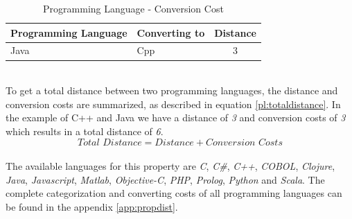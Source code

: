 \begin{table}[h]
	\centering 
	\setlength{\tabcolsep}{4pt}
	\begin{tabular}{|l|l|c|}\hline
		Programming Language	& Converting to &  Distance 	\\ \hline
		Java   				& Cpp		& 3      		\\ \hline
	\end{tabular} 
	\caption{Programming Language - Conversion Cost} 
	\label{property:proglangconversion} 
\end{table}\\
To get a total distance between two programming languages, the distance and conversion costs are summarized, as described in equation \ref{pl:totaldistance}. In the example of C++ and Java we have a distance of \textit{3} and conversion costs of \textit{3} which results in a total distance of \textit{6}.
\begin{equation}
\textit{Total Distance} = \textit{Distance} + \textit{Conversion Costs}\label{pl:totaldistance}
\end{equation}\\
The available languages for this property are \textit{C}, \textit{C\#}, \textit{C++}, \textit{COBOL}, \textit{Clojure}, \textit{Java}, \textit{Javascript}, \textit{Matlab}, \textit{Objective-C},\textit{ PHP}, \textit{Prolog}, \textit{Python} and \textit{Scala}. The complete categorization and converting costs of all programming languages can be found in the appendix \ref{app:propdist}.


